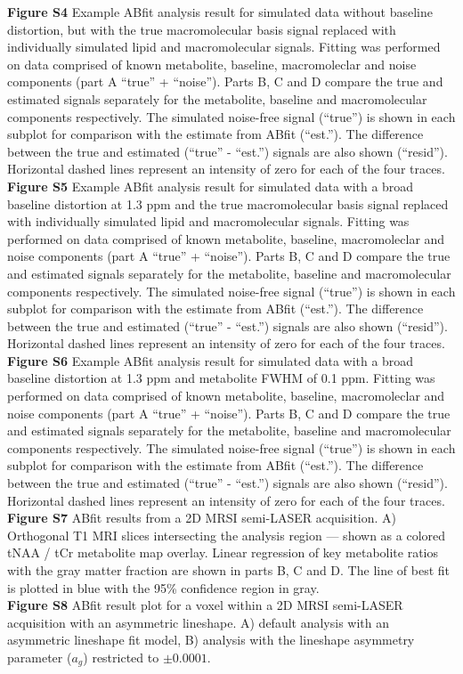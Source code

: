 \documentclass[num-refs]{wiley-article}
\begin{document}
\textbf{Figure S4} Example ABfit analysis result for simulated data without baseline distortion, but with the true macromolecular basis signal replaced with individually simulated lipid and macromolecular signals. Fitting was performed on data comprised of known metabolite, baseline, macromoleclar and noise components (part A ``true'' + ``noise''). Parts B, C and D compare the true and estimated signals separately for the metabolite, baseline and macromolecular components respectively. The simulated noise-free signal (``true'') is shown in each subplot for comparison with the estimate from ABfit (``est.''). The difference between the true and estimated (``true'' - ``est.'') signals are also shown (``resid''). Horizontal dashed lines represent an intensity of zero for each of the four traces.\\
\textbf{Figure S5} Example ABfit analysis result for simulated data with a broad baseline distortion at 1.3 ppm and the true macromolecular basis signal replaced with individually simulated lipid and macromolecular signals. Fitting was performed on data comprised of known metabolite, baseline, macromoleclar and noise components (part A ``true'' + ``noise''). Parts B, C and D compare the true and estimated signals separately for the metabolite, baseline and macromolecular components respectively. The simulated noise-free signal (``true'') is shown in each subplot for comparison with the estimate from ABfit (``est.''). The difference between the true and estimated (``true'' - ``est.'') signals are also shown (``resid''). Horizontal dashed lines represent an intensity of zero for each of the four traces.\\
\textbf{Figure S6} Example ABfit analysis result for simulated data with a broad baseline distortion at 1.3 ppm and metabolite FWHM of 0.1 ppm. Fitting was performed on data comprised of known metabolite, baseline, macromoleclar and noise components (part A ``true'' + ``noise''). Parts B, C and D compare the true and estimated signals separately for the metabolite, baseline and macromolecular components respectively. The simulated noise-free signal (``true'') is shown in each subplot for comparison with the estimate from ABfit (``est.''). The difference between the true and estimated (``true'' - ``est.'') signals are also shown (``resid''). Horizontal dashed lines represent an intensity of zero for each of the four traces.\\
\textbf{Figure S7} ABfit results from a 2D MRSI semi-LASER acquisition. A) Orthogonal T1 MRI slices intersecting the analysis region --- shown as a colored tNAA / tCr metabolite map overlay. Linear regression of key metabolite ratios with the gray matter fraction are shown in parts B, C and D. The line of best fit is plotted in blue with the 95\% confidence region in gray.\\
\textbf{Figure S8} ABfit result plot for a voxel within a 2D MRSI semi-LASER acquisition with an asymmetric lineshape. A) default analysis with an asymmetric lineshape fit model, B) analysis with the lineshape asymmetry parameter ($a_{g}$) restricted to $\pm 0.0001$.\\
\end{document}

